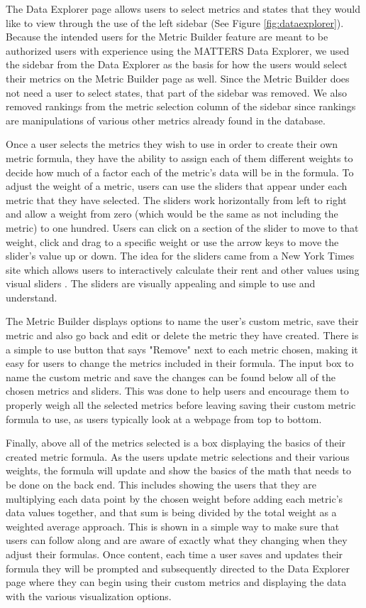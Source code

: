 			The Data Explorer page allows users to select metrics and states that they would like to view through the use of the left sidebar (See Figure \ref{fig:dataexplorer}). 
			Because the intended users for the Metric Builder feature are meant to be authorized users with 
			experience using the MATTERS Data Explorer, we used the sidebar from the Data Explorer as the 
			basis for how the users would select their metrics on the Metric Builder page as well. Since the Metric Builder does not need a user to select states, 
			that part of the sidebar was removed. We also removed rankings from the metric selection column of the sidebar since rankings are manipulations of 
			various other metrics already found in the database. 
			
			Once a user selects the metrics they wish to use in order to create their own metric formula, they have the ability to assign each of them different weights 
			to decide how much of a factor each of the metric's data will be in the formula. To adjust the weight of a metric, users can use the sliders that appear under 
			each metric that they have selected. The sliders work horizontally from left to right and allow a weight from zero (which would be the same as not including the metric) 
			to one hundred. Users can click on a section of the slider to move to that weight, click and drag to a specific weight or use the arrow keys to move the slider's value up or down. 
			The idea for the sliders came from a New York Times site which allows users to interactively calculate their rent and other values using visual sliders \cite{slider}. The sliders are 
			visually appealing and simple to use and understand.
			
			The Metric Builder displays options to name the user's custom metric, save their metric and also go back and edit or delete the metric they have created. There is a 
			simple to use button that says "Remove" next to each metric chosen, making it easy for users to change the metrics included in their formula. The input 
			box to name the custom metric and save the changes can be found below all of the chosen metrics and sliders. This was done to help users and encourage them to 
			properly weigh all the selected metrics before leaving saving their custom metric formula to use, as users typically look at a webpage from top to bottom.
		
			Finally, above all of the metrics selected is a box displaying the basics of their created metric formula. As the users update metric selections and their various weights,
			the formula will update and show the basics of the math that needs to be done on the back end. This includes showing the users that they are 
			multiplying each data point by the chosen weight before adding each metric's data values together, and that sum is being divided by the total weight as a weighted average approach. 
			This is shown in a simple way to make sure that users can follow along and are aware of exactly what they changing when they adjust their formulas. 
			Once content, each time a user saves and updates their formula they will be prompted and subsequently directed to the Data Explorer page where they can begin using their custom metrics and displaying the data with the various visualization options.
			

